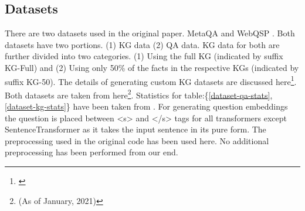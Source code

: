 \subsection{Datasets}\label{sec:datasets}

There are two datasets used in the original paper. MetaQA \cite{metaqa-dataset} and WebQSP \cite{webqsp-dataset}. Both datasets have two portions. (1) KG data (2) QA data. KG data for both are further divided into two categories. (1) Using the full KG (indicated by suffix KG-Full) and (2) Using only 50\% of the facts in the respective KGs (indicated by suffix KG-50). The details of generating custom KG datasets are discussed here\footnote{\label{embedKGQAgit}\embedKGQAgit}. Both datasets are taken from here\footnote{\shareddatasetlink \hspace{.1cm} (As of January, 2021)}. Statistics for table:\{\ref{dataset-qa-stats}, \ref{dataset-kg-stats}\} have been taken from \cite{saxena-etal-2020-improving}. For generating question embeddings the question is placed between <s> and </s> tags for all transformers except SentenceTransformer as it takes the input sentence in its pure form. The preprocessing used in the original code has been used here. No additional preprocessing has been performed from our end. 

